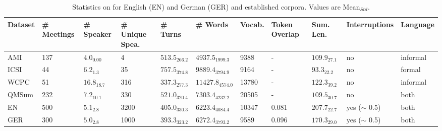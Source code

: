 \begin{table*}[t]
    \renewcommand{\arraystretch}{1.2} %
    \tiny
    \centering
    \begin{tabular}{lllllllllll}
        \toprule
        \rowcolor{gray!20} 
        Dataset & \# Meetings & \# Speaker & \# Unique Spea. & \# Turns & \# Words & Vocab. & Token Overlap & Sum. Len. & Interruptions & Language \\
        \midrule
        AMI   & 137 & $4.0_{\textit{0.00}}$ & 4    & $513.5_{\textit{266.2}}$ & $4937.5_{\textit{1999.3}}$ & 9388 & - & $109.9_{\textit{27.1}}$ & no &  informal \\
        ICSI  & 44  & $6.2_{\textit{1.3}}$   & 35   & $757.5_{\textit{374.8}}$ & $9889.4_{\textit{3794.9}}$ & 9164 & - & $93.3_{\textit{22.2}}$  & no &  formal \\
        WCPC  & 51  & $16.8_{\textit{18.7}}$ & 316  & $337.3_{\textit{277.3}}$ & $11427.8_{\textit{4574.0}}$ & 13780 & - & $122.3_{\textit{39.2}}$  & no &  informal \\
        QMSum & 232 & $7.2_{\textit{10.1}}$  & 330  & $521.0_{\textit{320.4}}$ & $7303.4_{\textit{4232.2}}$  & 20505 & - & $109.5_{\textit{30.7}}$  & no &  both \\
        \midrule
        EN    & 500 & $5.1_{\textit{2.8}}$  & 3200 & $405.0_{\textit{330.3}}$ & $6223.4_{\textit{4084.4}}$ & 10347 & 0.081 & $207.7_{\textit{22.7}}$ & yes ($\sim$ 0.5)&  both  \\
        GER   & 300 & $5.0_{\textit{2.8}}$  & 1000 & $393.3_{\textit{323.2}}$ & $6272.4_{\textit{3793.2}}$ & 9589  & 0.096 & $170.3_{\textit{29.0}}$ & yes ($\sim$ 0.5) & both  \\
        \bottomrule
    \end{tabular}
    \caption{Statistics on \dataset{} for English (EN) and German (GER) and established corpora. Values are Mean$_{Std}$.}
    \label{tab:corpora_metrics}
\end{table*}



